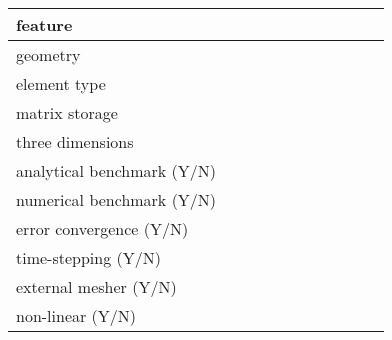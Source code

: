 \begin{landscape}
\noindent 
{\scriptsize
\begin{tabular}{|l|p{1.5cm}|p{1.5cm}|p{1.5cm}|p{1.5cm}|p{1.5cm}|p{1.5cm}|p{1.5cm}|p{1.5cm}|p{1.5cm}|p{1.5cm}|} 
\hline
feature & &&&&&&&&& \\ 
\hline
geometry &  &&&&&&&&& \\
element type &&&&&&&&&\\ 
matrix storage & & &&&&&&&& \\
\hline
three dimensions &  &&&&&&&&& \\
analytical benchmark (Y/N) &&&&&&&&&& \\
numerical benchmark (Y/N) &  &&&&&&&&& \\
error convergence (Y/N) & &&&&&&&&& \\
time-stepping (Y/N) &&&&&&&&&& \\
external mesher (Y/N) &&&&&&&&&& \\
non-linear (Y/N) &&&&&&&&&& \\
\hline
\end{tabular}
}












\newpage
{\scriptsize

}
\end{landscape}
